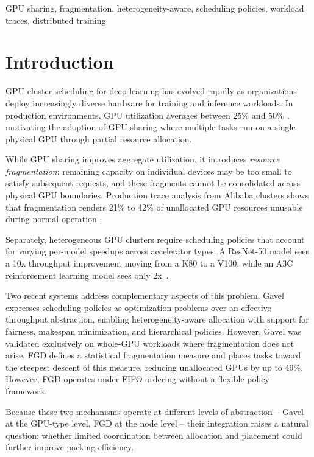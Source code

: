 \documentclass[conference]{IEEEtran}
\begin{document}
\begin{IEEEkeywords}
GPU sharing, fragmentation, heterogeneity-aware, scheduling policies, workload traces, distributed training
\end{IEEEkeywords}


\section{Introduction}
GPU cluster scheduling for deep learning has evolved rapidly as organizations deploy increasingly diverse hardware for training and inference workloads.
In production environments, GPU utilization averages between 25\% and 50\% \cite{FGD}, motivating the adoption of GPU sharing where multiple tasks run on a single physical GPU through partial resource allocation.

While GPU sharing improves aggregate utilization, it introduces \textit{resource fragmentation}: remaining capacity on individual devices may be too small to satisfy subsequent requests, and these fragments cannot be consolidated across physical GPU boundaries.
Production trace analysis from Alibaba clusters shows that fragmentation renders 21\% to 42\% of unallocated GPU resources unusable during normal operation \cite{ALIBABA, FGD}.

Separately, heterogeneous GPU clusters require scheduling policies that account for varying per-model speedups across accelerator types.
A ResNet-50 model sees a 10x throughput improvement moving from a K80 to a V100, while an A3C reinforcement learning model sees only 2x~\cite{GAVEL}.

Two recent systems address complementary aspects of this problem.
Gavel \cite{GAVEL} expresses scheduling policies as optimization problems over an effective throughput abstraction, enabling heterogeneity-aware allocation with support for fairness, makespan minimization, and hierarchical policies.
However, Gavel was validated exclusively on whole-GPU workloads where fragmentation does not arise.
FGD \cite{FGD} defines a statistical fragmentation measure and places tasks toward the steepest descent of this measure, reducing unallocated GPUs by up to 49\%.
However, FGD operates under FIFO ordering without a flexible policy framework.

Because these two mechanisms operate at different levels of abstraction -- Gavel at the GPU-type level, FGD at the node level -- their integration raises a natural question: whether limited coordination between allocation and placement could further improve packing efficiency.
\end{document}
